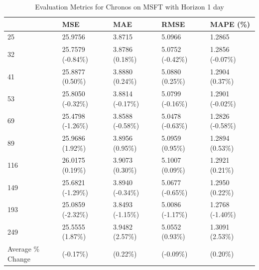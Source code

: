 \begin{table}
\caption{Evaluation Metrics for Chronos on MSFT with Horizon 1 day}
\label{tab:chronos_base_MSFT_h1_metrics}
\begin{tabular}{lllll}
\toprule
 & MSE & MAE & RMSE & MAPE (\%) \\
\midrule
25 & 25.9756 & 3.8715 & 5.0966 & 1.2865 \\
32 & 25.7579 (-0.84\%) & 3.8786 (0.18\%) & 5.0752 (-0.42\%) & 1.2856 (-0.07\%) \\
41 & 25.8877 (0.50\%) & 3.8880 (0.24\%) & 5.0880 (0.25\%) & 1.2904 (0.37\%) \\
53 & 25.8050 (-0.32\%) & 3.8814 (-0.17\%) & 5.0799 (-0.16\%) & 1.2901 (-0.02\%) \\
69 & 25.4798 (-1.26\%) & 3.8588 (-0.58\%) & 5.0478 (-0.63\%) & 1.2826 (-0.58\%) \\
89 & 25.9686 (1.92\%) & 3.8956 (0.95\%) & 5.0959 (0.95\%) & 1.2894 (0.53\%) \\
116 & 26.0175 (0.19\%) & 3.9073 (0.30\%) & 5.1007 (0.09\%) & 1.2921 (0.21\%) \\
149 & 25.6821 (-1.29\%) & 3.8940 (-0.34\%) & 5.0677 (-0.65\%) & 1.2950 (0.22\%) \\
193 & 25.0859 (-2.32\%) & 3.8493 (-1.15\%) & 5.0086 (-1.17\%) & 1.2768 (-1.40\%) \\
249 & 25.5555 (1.87\%) & 3.9482 (2.57\%) & 5.0552 (0.93\%) & 1.3091 (2.53\%) \\
Average \% Change & (-0.17\%) & (0.22\%) & (-0.09\%) & (0.20\%) \\
\bottomrule
\end{tabular}
\end{table}
